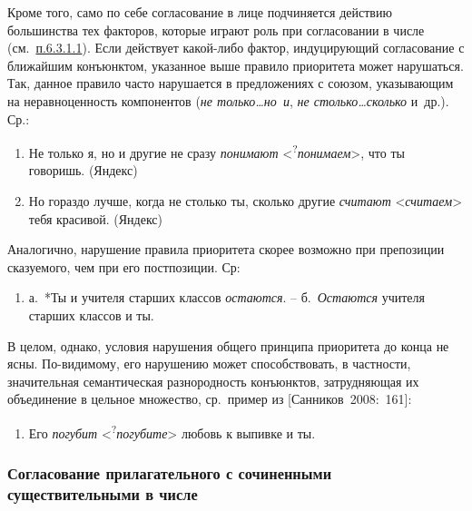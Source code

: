 Кроме того, само по себе согласование в лице подчиняется действию
большинства тех факторов, которые играют роль при согласовании в числе
(см.~\underline{п.6.3.1.1}). Если действует какой-либо фактор,
индуцирующий согласование с ближайшим конъюнктом, указанное выше правило
приоритета может нарушаться. Так, данное правило часто нарушается в
предложениях с союзом, указывающим на неравноценность компонентов
(\textit{не только\ldots но~и}, \textit{не столько\ldots сколько} и~др.).
Ср.:

\begin{enumerate}
  \def\labelenumi{(\arabic{enumi})}
  \setcounter{enumi}{123}
  \item
        Не только я, но и другие не сразу \textit{понимают}
        \textless{}\textsuperscript{?}\textit{понимаем}\textgreater, что ты
        говоришь. (Яндекс)
  \item
        Но гораздо лучше, когда не столько ты, сколько другие \textit{считают}
        \textless*\textit{считаем}\textgreater{} тебя красивой. (Яндекс)
\end{enumerate}

Аналогично, нарушение правила приоритета скорее возможно при препозиции
сказуемого, чем при его постпозиции. Ср:

\begin{enumerate}
  \def\labelenumi{(\arabic{enumi})}
  \setcounter{enumi}{125}
  \item
        а.~*Ты и учителя старших классов \textit{остаются}. --
        б.~\textit{Остаются} учителя старших классов и ты.
\end{enumerate}

В целом, однако, условия нарушения общего принципа приоритета до конца
не ясны. По-видимому, его нарушению может способствовать, в частности,
значительная семантическая разнородность конъюнктов, затрудняющая их
объединение в цельное множество, ср.~пример из {[}Санников~2008:~161{]}:

\begin{enumerate}
  \def\labelenumi{(\arabic{enumi})}
  \setcounter{enumi}{126}
  \item
        Его \textit{погубит}
        \textless*\textsuperscript{?}\textit{погубите}\textgreater{} любовь к
        выпивке и ты.
\end{enumerate}

\subsubsection{Согласование прилагательного с сочиненными
  существительными в
  числе}\label{ux441ux43eux433ux43bux430ux441ux43eux432ux430ux43dux438ux435-ux43fux440ux438ux43bux430ux433ux430ux442ux435ux43bux44cux43dux43eux433ux43e-ux441-ux441ux43eux447ux438ux43dux435ux43dux43dux44bux43cux438-ux441ux443ux449ux435ux441ux442ux432ux438ux442ux435ux43bux44cux43dux44bux43cux438-ux432-ux447ux438ux441ux43bux435}

